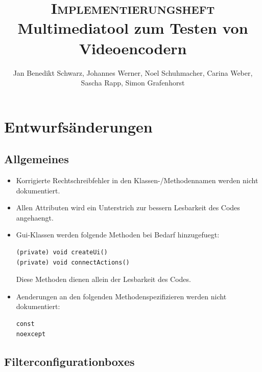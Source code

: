 \documentclass[parskip=full]{scrartcl}
\title{\fontsize{40}{48} \selectfont \textsc{Implementierungsheft}\\
{\fontsize{18}{18} \selectfont Multimediatool zum Testen von Videoencodern}}}
\author {Jan Benedikt Schwarz, Johannes Werner, Noel Schuhmacher, Carina Weber,\\
Sascha Rapp, Simon Grafenhorst}
\begin{document}
\maketitle
\thispagestyle{empty}
\newpage
\tableofcontents
\newpage
\section{Entwurfsänderungen}
\subsection{Allgemeines}
\begin{itemize}
\item Korrigierte Rechtschreibfehler in den Klassen-/Methodennamen werden nicht dokumentiert. 
\item Allen Attributen wird ein Unterstrich zur bessern Lesbarkeit des Codes angehaengt.
\item Gui-Klassen werden folgende Methoden bei Bedarf hinzugefuegt:
\begin{verbatim}
(private) void createUi()
(private) void connectActions()
\end{verbatim}
Diese Methoden dienen allein der Lesbarkeit des Codes.

\item Aenderungen an den folgenden Methodenspezifizieren werden nicht dokumentiert:
\begin{verbatim}
const
noexcept
\end{verbatim}

\end{itemize}
\subsection{Filterconfigurationboxes}
\end{document}
